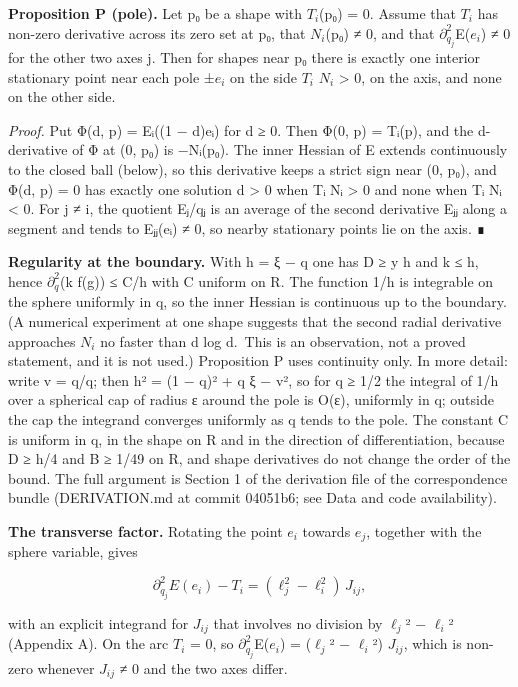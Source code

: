 \documentclass[
  11pt,
]{article}
\begin{document}
\textbf{Proposition P (pole).} Let p₀ be a shape with \(T_{i}\)(p₀) = 0.
Assume that \(T_{i}\) has non-zero derivative across its zero set at p₀,
that \(N_{i}\)(p₀) ≠ 0, and that \(\partial^2_{q_j}\)E(\(e_{i}\)) ≠ 0
for the other two axes j. Then for shapes near p₀ there is exactly one
interior stationary point near each pole ±\(e_{i}\) on the side
\(T_{i}\) \(N_{i}\) \textgreater{} 0, on the axis, and none on the other
side.

\emph{Proof.} Put Φ(d, p) = Eᵢ((1 − d)eᵢ) for d ≥ 0. Then Φ(0, p) =
Tᵢ(p), and the d-derivative of Φ at (0, p₀) is −Nᵢ(p₀). The inner
Hessian of E extends continuously to the closed ball (below), so this
derivative keeps a strict sign near (0, p₀), and Φ(d, p) = 0 has exactly
one solution d \textgreater{} 0 when Tᵢ Nᵢ \textgreater{} 0 and none
when Tᵢ Nᵢ \textless{} 0. For j ≠ i, the quotient Eⱼ/qⱼ is an average of
the second derivative Eⱼⱼ along a segment and tends to Eⱼⱼ(eᵢ) ≠ 0, so
nearby stationary points lie on the axis. ∎

\textbf{Regularity at the boundary.} With h = \textbar ξ − q\textbar{}
one has D ≥ y h and k ≤ h, hence \textbar{}\(\partial^2_{q}\)(k
f(g))\textbar{} ≤ C/h with C uniform on R. The function 1/h is
integrable on the sphere uniformly in q, so the inner Hessian is
continuous up to the boundary. (A numerical experiment at one shape
suggests that the second radial derivative approaches \(N_{i}\) no
faster than d log d.~This is an observation, not a proved statement, and
it is not used.) Proposition P uses continuity only. In more detail:
write v = q/\textbar q\textbar; then h² = (1 − \textbar q\textbar)² +
\textbar q\textbar{} \textbar ξ − v\textbar², so for
\textbar q\textbar{} ≥ 1/2 the integral of 1/h over a spherical cap of
radius ε around the pole is O(ε), uniformly in q; outside the cap the
integrand converges uniformly as q tends to the pole. The constant C is
uniform in q, in the shape on R and in the direction of differentiation,
because D ≥ h/4 and B ≥ 1/49 on R, and shape derivatives do not change
the order of the bound. The full argument is Section 1 of the derivation
file of the correspondence bundle (DERIVATION.md at commit 04051b6; see
Data and code availability).

\textbf{The transverse factor.} Rotating the point \(e_{i}\) towards
\(e_{j}\), together with the sphere variable, gives

\[
\partial_{q_j}^2E(e_i)-T_i=(\ell_j^2-\ell_i^2)\,J_{ij},
\]

with an explicit integrand for \(J_{ij}\) that involves no division by
\(\ell_{j}\)² − \(\ell_{i}\)² (Appendix A). On the arc \(T_{i}\) = 0, so
\(\partial^2_{q_j}\)E(\(e_{i}\)) = (\(\ell_{j}\)² − \(\ell_{i}\)²)
\(J_{ij}\), which is non-zero whenever \(J_{ij}\) ≠ 0 and the two axes
differ.
\end{document}
